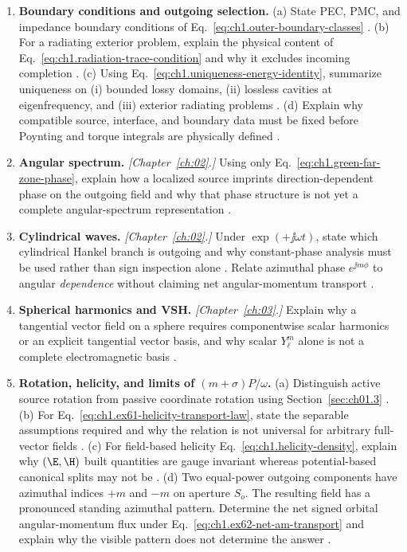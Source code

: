 \begin{enumerate}
\item \textbf{Boundary conditions and outgoing selection.}
(a) State PEC, PMC, and impedance boundary conditions of Eq.~\eqref{eq:ch1.outer-boundary-classes} \cite{stratton1941}.
(b) For a radiating exterior problem, explain the physical content of Eq.~\eqref{eq:ch1.radiation-trace-condition} and why it excludes incoming completion \cite{sommerfeld1949,stratton1941}.
(c) Using Eq.~\eqref{eq:ch1.uniqueness-energy-identity}, summarize uniqueness on (i) bounded lossy domains, (ii) lossless cavities at eigenfrequency, and (iii) exterior radiating problems \cite{stratton1941}.
(d) Explain why compatible source, interface, and boundary data must be fixed before Poynting and torque integrals are physically defined \cite{harrington2001}.

\item \textbf{Angular spectrum.}
\emph{[Chapter~\ref{ch:02}.]} Using only Eq.~\eqref{eq:ch1.green-far-zone-phase}, explain how a localized source imprints direction-dependent phase on the outgoing field and why that phase structure is not yet a complete angular-spectrum representation \cite{stratton1941,silver1949}.

\item \textbf{Cylindrical waves.}
\emph{[Chapter~\ref{ch:02}.]} Under $\exp(+\jj\omega t)$, state which cylindrical Hankel branch is outgoing and why constant-phase analysis must be used rather than sign inspection alone \cite{stratton1941,harrington2001}. Relate azimuthal phase $e^{\jj m\phi}$ to angular \emph{dependence} without claiming net angular-momentum transport \cite{beth1936}.

\item \textbf{Spherical harmonics and VSH.}
\emph{[Chapter~\ref{ch:03}.]} Explain why a tangential vector field on a sphere requires componentwise scalar harmonics or an explicit tangential vector basis, and why scalar $Y_\ell^m$ alone is not a complete electromagnetic basis \cite{stratton1941,hansen1988}.

\item \textbf{Rotation, helicity, and limits of $(m+\sigma)P/\omega$.}
(a) Distinguish active source rotation from passive coordinate rotation using Section~\ref{sec:ch01.3} \cite{beth1936,stratton1941}.
(b) For Eq.~\eqref{eq:ch1.ex61-helicity-transport-law}, state the separable assumptions required and why the relation is not universal for arbitrary full-vector fields \cite{stratton1941,allen1992}.
(c) For field-based helicity Eq.~\eqref{eq:ch1.helicity-density}, explain why $(\E,\H)$ built quantities are gauge invariant whereas potential-based canonical splits may not be \cite{jackson1999,belinfante1940}.
(d) Two equal-power outgoing components have azimuthal indices $+m$ and $-m$ on aperture $S_o$. The resulting field has a pronounced standing azimuthal pattern. Determine the net signed orbital angular-momentum flux under Eq.~\eqref{eq:ch1.ex62-net-am-transport} and explain why the visible pattern does not determine the answer \cite{allen1992,beth1936}.


\end{enumerate}
